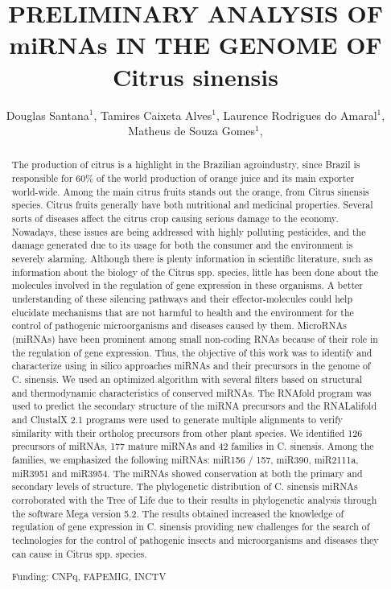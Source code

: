 \documentclass[twoside]{article}
\title{\vspace{-15mm}\fontsize{24pt}{10pt}\selectfont\textbf{ PRELIMINARY ANALYSIS OF miRNAs IN THE GENOME OF Citrus sinensis }} %
\author{ Douglas Santana$^{1}$, Tamires Caixeta Alves$^{1}$, Laurence Rodrigues do Amaral$^{1}$, Matheus de Souza Gomes$^{1}$, }
\affil{ 1 UFU

 }
\date{}
\begin{document}
  
  
  \maketitle %
  
  
  \thispagestyle{fancy} %
  
  
  \begin{abstract}
  The production of citrus is a highlight in the Brazilian agroindustry, since Brazil is responsible for 60\% of the world production of orange juice and its main exporter world-wide. Among the main citrus fruits stands out the orange, from Citrus sinensis species. Citrus fruits generally have both nutritional and medicinal properties. Several sorts of diseases affect the citrus crop causing serious damage to the economy. Nowadays, these issues are being addressed with highly polluting pesticides, and the damage generated due to its usage for both the consumer and the environment is severely alarming. Although there is plenty information in scientific literature, such as information about the biology of the Citrus spp. species, little has been done about the molecules involved in the regulation of gene expression in these organisms. A better understanding of these silencing pathways and their effector-molecules could help elucidate mechanisms that are not harmful to health and the environment for the control of pathogenic microorganisms and diseases caused by them. MicroRNAs (miRNAs) have been prominent among small non-coding RNAs because of their role in the regulation of gene expression. Thus, the objective of this work was to identify and characterize using in silico approaches miRNAs and their precursors in the genome of C. sinensis. We used an optimized algorithm with several filters based on structural and thermodynamic characteristics of conserved miRNAs. The RNAfold program was used to predict the secondary structure of the miRNA precursors and the RNALalifold and ClustalX 2.1 programs were used to generate multiple alignments to verify similarity with their ortholog precursors from other plant species. We identified 126 precursors of miRNAs, 177 mature miRNAs and 42 families in C. sinensis. Among the families, we emphasized the following miRNAs: miR156 / 157, miR390, miR2111a, miR3951 and miR3954. The miRNAs showed conservation at both the primary and secondary levels of structure. The phylogenetic distribution of C. sinensis miRNAs corroborated with the Tree of Life due to their results in phylogenetic analysis through the software Mega version 5.2. The results obtained increased the knowledge of regulation of gene expression in C. sinensis providing new challenges for the search of technologies for the control of pathogenic insects and microorganisms and diseases they can cause in Citrus spp. species.
  
  Funding: CNPq, FAPEMIG, INCTV \\ 
  \end{abstract}
  
\end{document}
